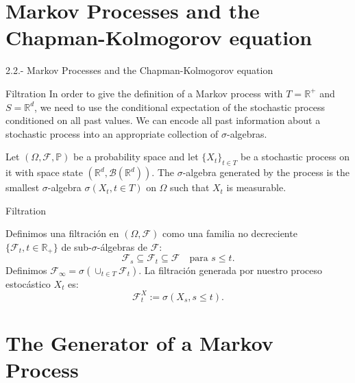 \documentclass[aspectratio=169,xcolor=dvipsnames]{beamer}
\begin{document}
\section{Markov Processes and the Chapman-Kolmogorov equation}

\begin{frame}
    \centering
    \Huge{2.2.- Markov Processes and the Chapman-Kolmogorov equation}
\end{frame}


\begin{frame}{Filtration}
    In order to give the definition of a Markov process with $T=\mathbb{R}^+$ and $S=\mathbb{R}^d$, we need to use the conditional expectation of the stochastic process conditioned on all past values. We can encode all past information about a stochastic process into an appropriate collection of $\sigma$-algebras.

    \begin{definition}
        Let $(\Omega, \mathcal{F}, \mathbb{P})$ be a probability space and let $\{X_t\}_{t \in T}$ be a stochastic process on it with space state $(\mathbb{R}^d, \mathcal{B}(\mathbb{R}^d))$. The $\sigma$-algebra generated by the process is the smallest $\sigma$-algebra $\sigma(X_t, t \in T)$ on $\Omega$ such that $X_t$ is measurable.
    \end{definition}
\end{frame}

\begin{frame}{Filtration}
    \begin{definition}[Filtration]
        Definimos una filtración en $(\Omega,\mathcal{F})$ como una familia no decreciente $\{\mathcal{F}_t, t \in \mathbb{R}_+\}$ de sub-$\sigma$-álgebras de $\mathcal{F}$:
        $$
        \mathcal{F}_s \subseteq \mathcal{F}_t \subseteq \mathcal{F} \quad \text{para } s \leq t.
        $$
        Definimos $\mathcal{F}_\infty = \sigma(\cup_{t\in T}\mathcal{F}_t)$. La filtración generada por nuestro proceso estocástico $X_t$ es:
        $$
        \mathcal{F}_t^X := \sigma(X_s, s \leq t).
        $$
    \end{definition}
\end{frame}

\section{The Generator of a Markov Process}
\end{document}
